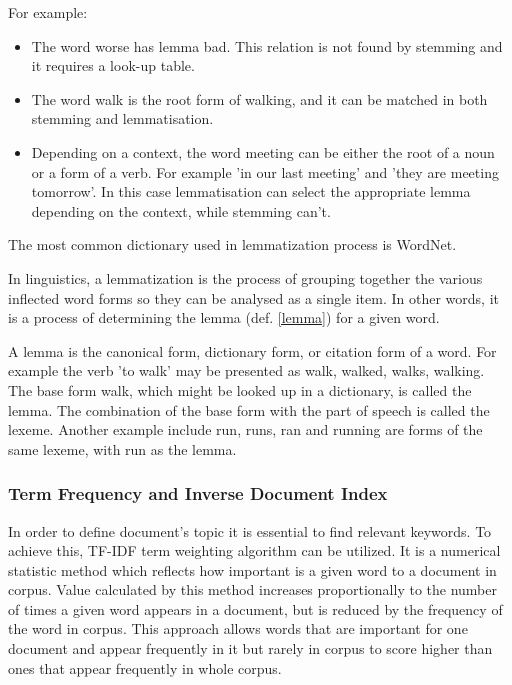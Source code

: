 For example:
\begin{itemize}
	\item The word worse has lemma bad. This relation is not found by stemming and it requires a look-up table.
	\item The word walk is the root form of walking, and it can be matched in both stemming and lemmatisation.
	\item Depending on a context, the word meeting can be either the root of a noun or a form of a verb. For example 'in our last meeting' and 'they are meeting tomorrow'. In this case lemmatisation can select the appropriate lemma depending on the context, while stemming can't.
\end{itemize}

The most common dictionary used in lemmatization process is WordNet.

 \begin{definition}[Lemmatization]
 	\label{lemmatization}
In linguistics, a lemmatization is the process of grouping together the various inflected word forms so they can be analysed as a single item. In other words, it is a process of determining the lemma (def. \ref{lemma}) for a given word.
 \end{definition}
 
  \begin{definition}[Lemma]
  	\label{lemma}
  A lemma is the canonical form, dictionary form, or citation form of a word. For example the verb 'to walk' may be presented as walk, walked, walks, walking. The base form walk, which might be looked up in a dictionary, is called the lemma. The combination of the base form with the part of speech is  called the lexeme. Another example include run, runs, ran and running are forms of the same lexeme, with run as the lemma. 
  \end{definition}
 
\subsubsection{Term Frequency and Inverse Document Index}
In order to define document's topic it is essential to find relevant keywords. To achieve this, TF-IDF term weighting algorithm can be utilized. It is a numerical statistic method which reflects how important is a given word to a document in corpus. Value calculated by this method increases proportionally to the number of times a given word appears in a document, but is reduced by the frequency of the word in corpus. This approach allows words that are important for one document and appear frequently in it but rarely in corpus to score higher than ones that appear frequently in whole corpus.


